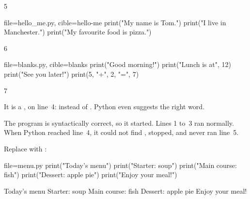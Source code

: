 \begin{corrige}{5}
\begin{code}{file=hello_me.py, cible=hello-me}
print("My name is Tom.")
print("I live in Manchester.")
print("My favourite food is pizza.")
\end{code}
\end{corrige}

\begin{corrige}{6}
\begin{code}{file=blanks.py, cible=blanks}
print("Good morning!")
print("Lunch is at", 12)
print("See you later!")
print(5, "+", 2, "=", 7)
\end{code}
\end{corrige}

\begin{corrige}{7}
\begin{reponses}
\item It is a , on line~4:  instead of . Python even suggests the
  right word.
\item The program is syntactically correct, so it started. Lines 1 to~3 ran normally. When Python
  reached line~4, it could not find , stopped, and never ran line~5.
\item Replace  with :
\end{reponses}
\begin{code}{file=menu.py}
print("Today's menu")
print("Starter: soup")
print("Main course: fish")
print("Dessert: apple pie")
print("Enjoy your meal!")
\end{code}
\begin{sortie}
Today's menu
Starter: soup
Main course: fish
Dessert: apple pie
Enjoy your meal!
\end{sortie}
\end{corrige}

